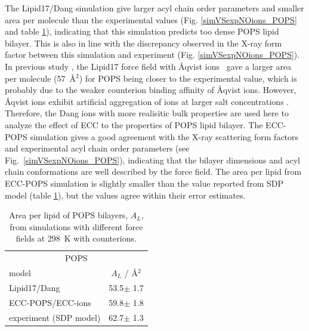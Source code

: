 \documentclass[journal=jpcbfk,manuscript=article]{achemso}
\begin{document}
The Lipid17/Dang simulation give larger acyl chain order parameters and smaller area per molecule than the
experimental values (Fig. \ref{simVSexpNOions_POPS} and table \ref{tab:apls}),
indicating that this simulation predicts too dense POPS lipid bilayer. This is also in line with
the discrepancy observed in the X-ray form factor between this simulation and experiment (Fig. \ref{simVSexpNOions_POPS}).
In previous study \cite{NMRlipidsIV}, the Lipid17 force field with {\AA}qvist ions~\cite{aqvist90}
gave a larger area per molecule (57~\AA$^2$) for POPS being closer to the experimental value,
which is probably due to the weaker counterion binding affinity of {\AA}qvist ions.
However,  {\AA}qvist ions exhibit artificial aggregation of ions at larger salt concentrations \cite{kohagen16, chen07, NMRlipidsIV}.
Therefore, the Dang ions with more realisitic bulk properties are used here to analyze the effect of ECC to the properties of POPS lipid bilayer. 
The ECC-POPS simulation gives a good agreement with the X-ray scattering form factors and experimental
acyl chain order parameters (see Fig.~\ref{simVSexpNOions_POPS}), indicating that the bilayer dimensions and acyl chain
conformations are well described by the force field. The area per lipid from ECC-POPS simulation is slightly
smaller than the value reported from SDP model \cite{kucerka14} (table \ref{tab:apls}), but the values
agree within their error estimates. 



\begin{table}[tb!] 
\centering
  \caption{Area per lipid of POPS bilayers, $A_L$, from simulations with different force fields at 298~K with  counterions. \label{tab:apls} } 
  \begin{tabular}{l|c } 
    \multicolumn{2}{c}{POPS} \\
    model          & $A_L$ / Å$^2$    \\ 
    \hline 
    Lipid17/Dang              & 53.5$\pm$ 1.7   \\ 
    ECC-POPS/ECC-ions         & 59.8$\pm$ 1.8   \\ 
    experiment (SDP model) \citep{kucerka14} & 62.7$\pm$ 1.3  \\ 
  \end{tabular} \\
\end{table} 
\end{document}
